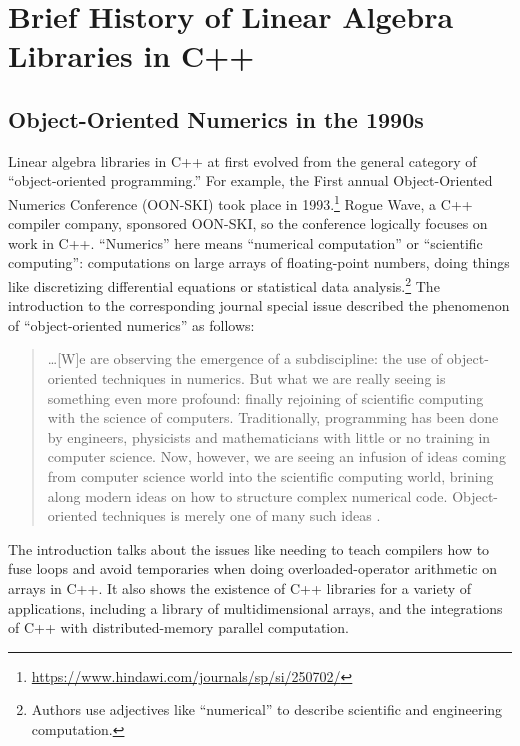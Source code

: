 \chapter{Brief History of Linear Algebra Libraries in C++}

\section{Object-Oriented Numerics in the 1990s}

Linear algebra libraries in C++ at first evolved from the general category of
``object-oriented programming.'' For example, the First annual Object-Oriented
Numerics Conference (OON-SKI) took place in
1993.\footnote{\url{https://www.hindawi.com/journals/sp/si/250702/}}
Rogue Wave, a C++ compiler company, sponsored OON-SKI,
so the conference logically focuses on work in C++.
``Numerics'' here means ``numerical computation'' or ``scientific computing'':
computations on large arrays of floating-point numbers, doing things like
discretizing differential equations or statistical data analysis.\footnote{
Authors use adjectives like ``numerical'' to describe scientific and engineering
computation.}  The introduction to the corresponding journal special issue
described the phenomenon of ``object-oriented numerics'' as follows:

\begin{quote}
  \ldots [W]e are observing the emergence of a subdiscipline: the use of
  object-oriented techniques in numerics. But what we are really seeing is
  something even more profound: finally rejoining of scientific computing with
  the science of computers. Traditionally, programming has been done by
  engineers, physicists and mathematicians with little or no training in
  computer science. Now, however, we are seeing an infusion of ideas coming from
  computer science world into the scientific computing world, brining along
  modern ideas on how to structure complex numerical code. Object-oriented
  techniques is merely one of many such ideas \cite{Vermeulen1993}.
\end{quote}

The introduction talks about the issues like needing to teach compilers how to
fuse loops and avoid temporaries when doing overloaded-operator arithmetic on
arrays in C++. It also shows the existence of C++ libraries for a variety of
applications, including a library of multidimensional arrays, and the
integrations of C++ with distributed-memory parallel computation.

